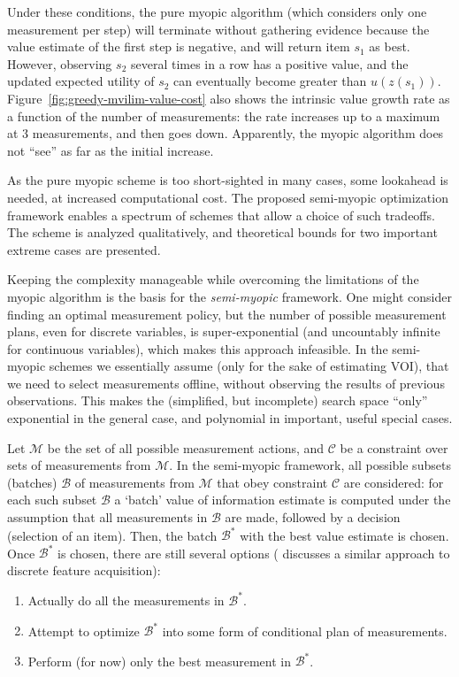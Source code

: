 Under these conditions, the pure myopic algorithm (which considers
only one measurement per step)
will terminate without gathering evidence because the value estimate
of the first step is negative, and will return item $s_1$ as
best. However, observing $s_2$ several times in a row has a positive
value, and the updated expected utility of $s_2$ can eventually become
greater than $u(z(s_1))$.  Figure~\ref{fig:greedy-mvilim-value-cost} also
shows the intrinsic value growth rate as a function of the number of
measurements: the rate increases up to a maximum at 3 measurements,
and then goes down. Apparently, the myopic algorithm does not ``see''
as far as the initial increase.

As the pure myopic scheme is too short-sighted in many cases,
some lookahead is needed, at increased computational cost.
The proposed semi-myopic optimization framework enables
a spectrum of schemes that allow a choice of such tradeoffs.
The scheme is analyzed qualitatively,
and theoretical bounds for two important extreme cases are presented.

Keeping the complexity manageable while
overcoming the limitations of the myopic algorithm
is the basis for the {\em semi-myopic} framework.
One might consider finding an optimal measurement policy, but
the number of possible measurement plans,
even for discrete variables, is super-exponential
(and uncountably infinite for continuous variables), which 
makes this approach infeasible.
In the semi-myopic schemes we essentially assume (only for the sake of
estimating VOI), that we need to select
measurements offline, without observing the results of previous
observations. This makes the (simplified, but incomplete) search space ``only''
exponential in the general case, and polynomial in important,
useful special cases.

Let ${\mathcal M}$ be the set of all possible measurement
actions, and ${\mathcal C}$ be a constraint over sets of
measurements from ${\mathcal M}$. In the semi-myopic framework,
all possible subsets (batches) ${\mathcal B}$ of measurements from ${\mathcal M}$
that obey constraint ${\mathcal C}$ are considered: for each
such subset ${\mathcal B}$ a `batch' value of information estimate is computed
under the assumption that all measurements in ${\mathcal B}$ are made, 
followed by
a decision (selection of an item). Then, the batch
${\mathcal B}^*$ with the best value estimate is chosen. Once 
${\mathcal B}^*$ is chosen, there are still several options
(\cite{BilgicGetoor.voila} discusses a similar approach to discrete
feature acquisition):
\begin{enumerate}
\item Actually do all the measurements in ${\mathcal B}^*$.
\item Attempt to optimize ${\mathcal B}^*$ into some form of
  conditional plan of measurements.
\item Perform (for now) only the best measurement in ${\mathcal B}^*$.
\end{enumerate}

